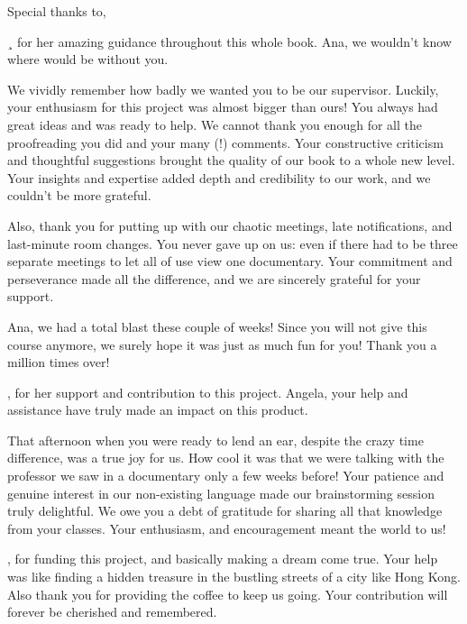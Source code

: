 
Special thanks to, 

¸ for her amazing guidance throughout this whole book. Ana, we wouldn’t know where would be without you. 

We vividly remember how badly we wanted you to be our supervisor. Luckily, your enthusiasm for this project was almost bigger than ours! You always had great ideas and was ready to help. We cannot thank you enough for all the proofreading you did and your many (!) comments. Your constructive criticism and thoughtful suggestions brought the quality of our book to a whole new level. Your insights and expertise added depth and credibility to our work, and we couldn’t be more grateful.  

Also, thank you for putting up with our chaotic meetings, late notifications, and last-minute room changes. You never gave up on us: even if there had to be three separate meetings to let all of use view one documentary. Your commitment and perseverance made all the difference, and we are sincerely grateful for your support. 

Ana, we had a total blast these couple of weeks! Since you will not give this course anymore, we surely hope it was just as much fun for you! Thank you a million times over! 

  

, for her support and contribution to this project. Angela, your help and assistance have truly made an impact on this product.  

That afternoon when you were ready to lend an ear, despite the crazy time difference, was a true joy for us. How cool it was that we were talking with the professor we saw in a documentary only a few weeks before! Your patience and genuine interest in our non-existing language made our brainstorming session truly delightful. We owe you a debt of gratitude for sharing all that knowledge from your classes. Your enthusiasm, and encouragement meant the world to us! 

 

, for funding this project,  and basically making a dream come true. Your help was like finding a hidden treasure in the bustling streets of a city like Hong Kong. Also thank you for providing the coffee to keep us going. Your contribution will forever be cherished and remembered.
